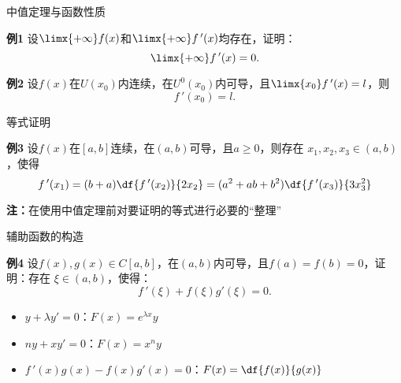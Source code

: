 \begin{frame}{中值定理与函数性质}
	\linespread{1.2}\pause 
	\begin{exampleblock}{{\bf 例1}\hfill }
		设$\limx{+\infty}f(x)$和$\limx{+\infty}f\,'(x)$均存在，证明：
		$$\limx{+\infty}f\,'(x)=0.$$
	\end{exampleblock}\pause 
	\begin{exampleblock}{{\bf 例2}\hfill}
		设$f(x)$在$U(x_0)$内连续，在$U^0(x_0)$内可导，且$\limx{x_0}f\,'(x)=l$，则
		$$f\,'(x_0)=l.$$
	\end{exampleblock}
\end{frame}

\begin{frame}{等式证明}
	\linespread{1.5}\pause 
	\begin{exampleblock}{{\bf 例3}\hfill}
		设$f(x)$在$[a,b]$连续，在$(a,b)$可导，且$a\geq 0$，则存在
		$x_1,x_2,x_3\in(a,b)$，使得
		$$f\,'(x_1)=(b+a)\df{f\,'(x_2)}{2x_2}=(a^2+ab+b^2)\df{f\,'(x_3)}{3x_3^2}$$
	\end{exampleblock}\pause 
	{\bf 注：}\alert{在使用中值定理前对要证明的等式进行必要的“整理”}
\end{frame}

\begin{frame}{辅助函数的构造}
	\linespread{1.2}\pause 
	\begin{exampleblock}{{\bf 例4}\hfill }
		设$f(x),g(x)\in C[a,b]$，在$(a,b)$内可导，且$f(a)=f(b)=0$，证明：存在
		$\xi\in(a,b)$，使得：
		\vspace{-1ex}
		$$f\,'(\xi)+f(\xi)g'(\xi)=0.$$
	\end{exampleblock}\pause 
	\begin{itemize}
	  \item \alert{$y+\lambda y'=0$：\pause $F(x)=e^{\lambda x}y$}\pause 
	  \item \alert{$ny+xy'=0$：\pause $F(x)=x^ny$}\pause 
	  \item \alert{$f\,'(x)g(x)-f(x)g'(x)=0$：\pause $F(x)=\df{f(x)}{g(x)}$}
	\end{itemize}
\end{frame}

